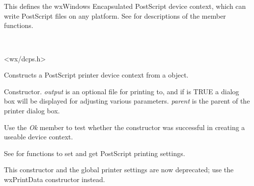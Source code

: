 \section{}\label{wxpostscriptdc}

This defines the wxWindows Encapsulated PostScript device context,
which can write PostScript files on any platform. See  for
descriptions of the member functions.


\\


<wx/dcps.h>



Constructs a PostScript printer device context from a  object.


Constructor. {\it output} is an optional file for printing to, and if
 is TRUE a dialog box will be displayed for adjusting
various parameters. {\it parent} is the parent of the printer dialog box.

Use the {\it Ok} member to test whether the constructor was successful
in creating a useable device context.

See  for functions to set and
get PostScript printing settings.

This constructor and the global printer settings are now deprecated;
use the wxPrintData constructor instead.



